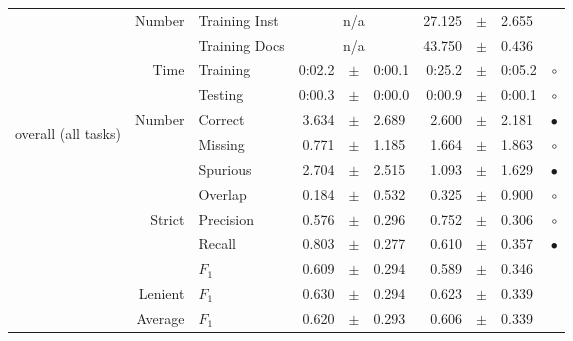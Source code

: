 \begin{longtable}{|r|r|l||rcl|rcl|c|}
\cline{2-10} & \multirow{2}{*}{    Number} &   Training Inst &    \multicolumn{3}{c|}{n/a}         &      27.125 &  $\pm$  &       2.655 &  \\
\cline{3-10} &                             &   Training Docs &    \multicolumn{3}{c|}{n/a}         &      43.750 &  $\pm$  &       0.436 &  \\
\cline{2-10} & \multirow{2}{*}{      Time} &        Training &      0:02.2 &  $\pm$  &      0:00.1 &      0:25.2 &  $\pm$  &      0:05.2 & $\circ$ \\
\cline{3-10} &                             &         Testing &      0:00.3 &  $\pm$  &      0:00.0 &      0:00.9 &  $\pm$  &      0:00.1 & $\circ$ \\
\hline
\hline
\multirow{11}{*}{\begin{sideways}overall (all tasks)\end{sideways} }
             & \multirow{4}{*}{    Number} &         Correct &       3.634 &  $\pm$  &       2.689 &       2.600 &  $\pm$  &       2.181 & $\bullet$ \\
\cline{3-10} &                             &         Missing &       0.771 &  $\pm$  &       1.185 &       1.664 &  $\pm$  &       1.863 & $\circ$ \\
\cline{3-10} &                             &        Spurious &       2.704 &  $\pm$  &       2.515 &       1.093 &  $\pm$  &       1.629 & $\bullet$ \\
\cline{3-10} &                             &         Overlap &       0.184 &  $\pm$  &       0.532 &       0.325 &  $\pm$  &       0.900 & $\circ$ \\
\cline{2-10} & \multirow{3}{*}{    Strict} &       Precision &       0.576 &  $\pm$  &       0.296 &       0.752 &  $\pm$  &       0.306 & $\circ$ \\
\cline{3-10} &                             &          Recall &       0.803 &  $\pm$  &       0.277 &       0.610 &  $\pm$  &       0.357 & $\bullet$ \\
\cline{3-10} &                             &           $F_1$ &       0.609 &  $\pm$  &       0.294 &       0.589 &  $\pm$  &       0.346 &  \\
\cline{2-10} &                     Lenient &           $F_1$ &       0.630 &  $\pm$  &       0.294 &       0.623 &  $\pm$  &       0.339 &  \\
\cline{2-10} &                     Average &           $F_1$ &       0.620 &  $\pm$  &       0.293 &       0.606 &  $\pm$  &       0.339 &  \\

\end{longtable}
